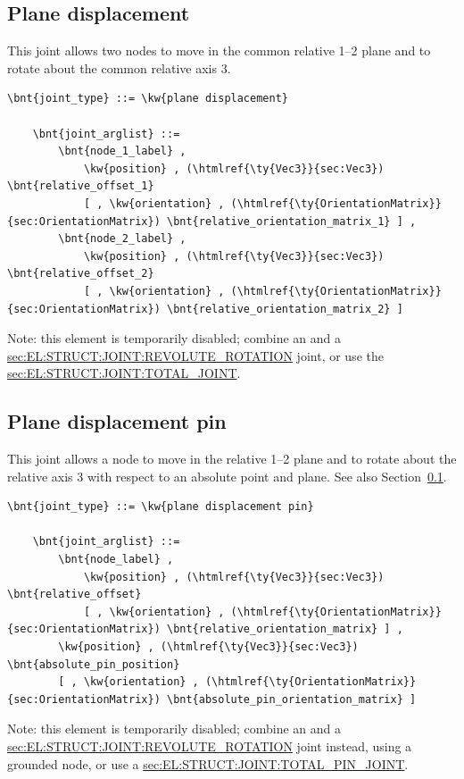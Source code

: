 \subsection{Plane displacement}\label{sec:EL:STRUCT:JOINT:PLANE_DISPLACEMENT}
This joint allows two nodes to move in the common relative 1--2 plane 
and to rotate about the common relative axis 3.
\begin{Verbatim}[commandchars=\\\{\}]
    \bnt{joint_type} ::= \kw{plane displacement}

    \bnt{joint_arglist} ::= 
        \bnt{node_1_label} ,
            \kw{position} , (\htmlref{\ty{Vec3}}{sec:Vec3}) \bnt{relative_offset_1}
            [ , \kw{orientation} , (\htmlref{\ty{OrientationMatrix}}{sec:OrientationMatrix}) \bnt{relative_orientation_matrix_1} ] ,
        \bnt{node_2_label} ,
            \kw{position} , (\htmlref{\ty{Vec3}}{sec:Vec3}) \bnt{relative_offset_2}
            [ , \kw{orientation} , (\htmlref{\ty{OrientationMatrix}}{sec:OrientationMatrix}) \bnt{relative_orientation_matrix_2} ]
\end{Verbatim}
Note: this element is temporarily disabled;
combine an  and a
\hyperref{\kw{revolute rotation}}{\kw{revolute rotation} (see Section~}{)}{sec:EL:STRUCT:JOINT:REVOLUTE_ROTATION}
joint, or use the 
\hyperref{\kw{total joint}}{\kw{total joint}, see Section~}{}{sec:EL:STRUCT:JOINT:TOTAL_JOINT}.

\subsection{Plane displacement pin}
This joint allows a node to move in the relative 1--2 plane 
and to rotate about the relative axis 3 with respect to an absolute point 
and plane.
See also Section~\ref{sec:EL:STRUCT:JOINT:PLANE_DISPLACEMENT}.
\begin{Verbatim}[commandchars=\\\{\}]
    \bnt{joint_type} ::= \kw{plane displacement pin}

    \bnt{joint_arglist} ::= 
        \bnt{node_label} ,
            \kw{position} , (\htmlref{\ty{Vec3}}{sec:Vec3}) \bnt{relative_offset}
            [ , \kw{orientation} , (\htmlref{\ty{OrientationMatrix}}{sec:OrientationMatrix}) \bnt{relative_orientation_matrix} ] ,
        \kw{position} , (\htmlref{\ty{Vec3}}{sec:Vec3}) \bnt{absolute_pin_position}
        [ , \kw{orientation} , (\htmlref{\ty{OrientationMatrix}}{sec:OrientationMatrix}) \bnt{absolute_pin_orientation_matrix} ]
\end{Verbatim}
Note: this element is temporarily disabled;
combine an  and a
\hyperref{\kw{revolute rotation}}{\kw{revolute rotation} (see Section~}{)}{sec:EL:STRUCT:JOINT:REVOLUTE_ROTATION}
joint instead, using a grounded node, or use a
\hyperref{\kw{total pin joint}}{\kw{total pin joint}, see Section~}{}{sec:EL:STRUCT:JOINT:TOTAL_PIN_JOINT}.


